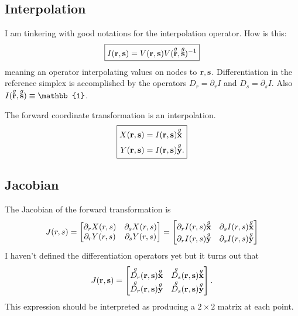 \subsection{Interpolation}

I am tinkering with good notations for the interpolation operator.  How is this:
%
\begin{equation}
\boxed{
I(\ve r, \ve s) = V(\ve r, \ve s) V(\g{\ve r}, \g{\ve s})^{-1}
}%
\end{equation}
%
meaning an operator interpolating values on nodes to $\textbf{r}, \textbf{s}$.  Differentiation in the reference simplex is accomplished by the operators $D_r = \partial_r I$ and $D_s = \partial_s I$.  Also $I(\g{\ve r}, \g{\ve s}) \equiv \mathbb{1}$.

The forward coordinate transformation is an interpolation.
%
\begin{equation}
\boxed{
\begin{aligned}
X(\ve r, \ve s) &= I(\ve r, \ve s) \g{\ve x} \\
Y(\ve r, \ve s) &= I(\ve r, \ve s) \g{\ve y}.
\end{aligned}
}%
\end{equation}

\subsection{Jacobian}
\label{sec:curvilinear_jacobian}

The Jacobian of the forward transformation is
%
\begin{equation}
J(r, s) =
\begin{bmatrix}
\partial_r X(r, s) & \partial_s X(r, s) \\
\partial_r Y(r, s) & \partial_s Y(r, s)
\end{bmatrix}
=
\begin{bmatrix}
\partial_r I(r, s) \overset{g}{\textbf{x}} & \partial_s I(r, s) \overset{g}{\textbf{x}} \\
\partial_r I(r, s) \overset{g}{\textbf{y}} & \partial_s I(r, s) \overset{g}{\textbf{y}}
\end{bmatrix}
\end{equation}
%
I haven't defined the differentiation operators yet but it turns out that
%
\begin{equation}
J(\textbf{r}, \textbf{s}) =
\begin{bmatrix}
\overset{g}{D_r}(\textbf{r}, \textbf{s}) \overset{g}{\textbf{x}} & \overset{g}{D_s}(\textbf{r}, \textbf{s}) \overset{g}{\textbf{x}} \\
\overset{g}{D_r}(\textbf{r}, \textbf{s}) \overset{g}{\textbf{y}} & \overset{g}{D_s}(\textbf{r}, \textbf{s}) \overset{g}{\textbf{y}}
\end{bmatrix}.
\end{equation}
%
This expression should be interpreted as producing a $2 \times 2$ matrix at each point.

